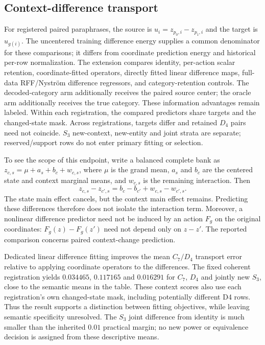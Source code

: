 \subsection{Context-difference transport}

For registered paired paraphrases, the source is $u_i=z_{p_0,i}-z_{p_1,i}$ and the target is $u_{g(i)}$. The uncentered training difference energy supplies a common denominator for these comparisons; it differs from coordinate prediction energy and historical per-row normalization. The extension compares identity, per-action scalar retention, coordinate-fitted operators, directly fitted linear difference maps, full-data RFF/Nystr\"om difference regressors, and category-retention controls. The decoded-category arm additionally receives the paired source center; the oracle arm additionally receives the true category. These information advantages remain labeled. Within each registration, the compared predictors share targets and the changed-state mask. Across registrations, targets differ and retained $D_4$ pairs need not coincide. $S_3$ new-context, new-entity and joint strata are separate; reserved/support rows do not enter primary fitting or selection.

To see the scope of this endpoint, write a balanced complete bank as $z_{c,s}=\mu+a_s+b_c+w_{c,s}$, where $\mu$ is the grand mean, $a_s$ and $b_c$ are the centered state and context marginal means, and $w_{c,s}$ is the remaining interaction. Then
\[
 z_{c,s}-z_{c',s}=b_c-b_{c'}+w_{c,s}-w_{c',s}.
\]
The state main effect cancels, but the context main effect remains. Predicting these differences therefore does not isolate the interaction term. Moreover, a nonlinear difference predictor need not be induced by an action $F_g$ on the original coordinates: $F_g(z)-F_g(z')$ need not depend only on $z-z'$. The reported comparison concerns paired context-change prediction.

Dedicated linear difference fitting improves the mean $C_7/D_4$ transport error relative to applying coordinate operators to the differences. The fixed coherent registration yields $0.034465$, $0.117165$ and $0.016291$ for $C_7$, $D_4$ and jointly new $S_3$, close to the semantic means in the table. These context scores also use each registration's own changed-state mask, including potentially different D4 rows. Thus the result supports a distinction between fitting objectives, while leaving semantic specificity unresolved. The $S_3$ joint difference from identity is much smaller than the inherited $0.01$ practical margin; no new power or equivalence decision is assigned from these descriptive means.

